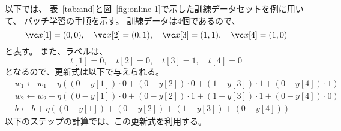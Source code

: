 以下では、
表~\ref{tab:and}と図~\ref{fig:online-1}で示した訓練データセットを例に用いて、
バッチ学習の手順を示す。
訓練データは4個であるので、
\[
  \vc x[1] = (0, 0), \quad
  \vc x[2] = (0, 1), \quad 
  \vc x[3] = (1, 1), \quad 
  \vc x[4] = (1, 0) 
\]
と表す。
また、ラベルは、
\[
  t[1] = 0, \quad
  t[2] = 0, \quad 
  t[3] = 1, \quad 
  t[4] = 0
\]
となるので、更新式は以下で与えられる。
\begin{align*}
  &
      w_1 \leftarrow w_1 + \eta \left(
    ( 0 - y[1]) \cdot 0
     + (0 - y[2]) \cdot 0
     + (1 - y[3]) \cdot 1
     + (0 - y[4]) \cdot 1
      \right)
    \\&
      w_2 \leftarrow w_2 + \eta \left(
    ( 0 - y[1]) \cdot 0
     + (0 - y[2]) \cdot 1
     + (1 - y[3]) \cdot 1
     + (0 - y[4]) \cdot 0
      \right)
    \\&
      b \leftarrow b + \eta \left(
    ( 0 - y[1])
     + (0 - y[2])
     + (1 - y[3])
     + (0 - y[4])
      \right)
\end{align*}
以下のステップの計算では、この更新式を利用する。

